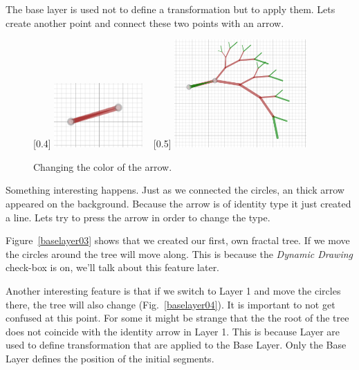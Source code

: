             The base layer is used not to define a transformation but to apply them.
            Lets create another point and connect these two points with an arrow.

            \begin{figure}[H]
                \centering
                \caption{Changing the color of the arrow.}
                [0.4\textwidth]
                    {\includegraphics[width=0.3\textwidth]{img/baselayer02.png}}
                ~
                [0.5\textwidth]
                    {\includegraphics[width=0.45\textwidth]{img/baselayer03.png}}
            \end{figure}

            Something interesting happens. 
            Just as we connected the circles, an thick arrow appeared on the background.
            Because the arrow is of identity type it just created a line.
            Lets try to press the arrow in order to change the type.

            \FloatBarrier

            Figure~\ref{baselayer03} shows that we created our first, own fractal tree.
            If we move the circles around the tree will move along.
            This is because the \emph{Dynamic Drawing} check-box is on, we'll talk about this feature later.

            Another interesting feature is that if we switch to Layer 1 and move the circles there, the tree will also change (Fig.~\ref{baselayer04}).
            It is important to not get confused at this point.
            For some it might be strange that the the root of the tree does not coincide with the identity arrow in Layer 1.
            This is because Layer are used to define transformation that are applied to the Base Layer.
            Only the Base Layer defines the position of the initial segments.

